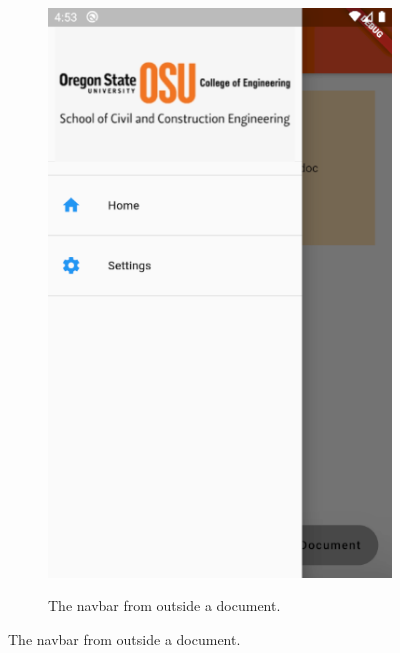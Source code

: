 \documentclass[onecolumn, draftclsnofoot,10pt, compsoc]{IEEEtran}
\begin{document}
\begin{figure}
\begin{subfigure}{.5\textwidth}
    \includegraphics[scale=0.5]{Images/navbar_home.png}
    \label{Fig 12.}
    \caption{ The navbar from outside a document.}
\end{subfigure}
\end{figure}
\end{document}
